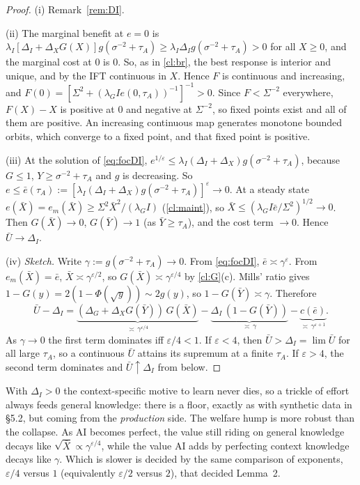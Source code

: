 \documentclass[11pt,a4paper]{article}
\theoremstyle{definition}
\theoremstyle{remark}
\newcommand{\tA}{\tau_A}
\newcommand{\lI}{\lambda_I}
\newcommand{\lG}{\lambda_G}
\begin{document}
\begin{proof}
(i) Remark~\ref{rem:DI}.

(ii) The marginal benefit at $e=0$ is $\lI[\Delta_I+\Delta_XG(X)]g(\sigma^{-2}+\tA)\ge\lI\Delta_Ig(\sigma^{-2}+\tA)>0$
for all $X\ge0$, and the marginal cost at $0$ is $0$. So, as in \cref{cl:br}, the best response is interior and
unique, and by the IFT continuous in $X$. Hence $F$ is continuous and increasing, and
$F(0)=[\Sigma^2+(\lG Ie(0,\tA))^{-1}]^{-1}>0$. Since $F<\Sigma^{-2}$ everywhere, $F(X)-X$ is positive at $0$ and
negative at $\Sigma^{-2}$, so fixed points exist and all of them are positive. An increasing continuous map
generates monotone bounded orbits, which converge to a fixed point, and that fixed point is positive.

(iii) At the solution of \eqref{eq:focDI},
$e^{1/\varepsilon}\le\lI(\Delta_I+\Delta_X)g(\sigma^{-2}+\tA)$, because $G\le1$, $Y\ge\sigma^{-2}+\tA$ and $g$ is decreasing. So
$e\le\bar e(\tA):=[\lI(\Delta_I+\Delta_X)g(\sigma^{-2}+\tA)]^\varepsilon\to0$. At a steady state
$e(\bar X)=e_m(\bar X)\ge\Sigma^2\bar X^2/(\lG I)$ (\cref{cl:maint}), so $\bar X\le(\lG I\bar e/\Sigma^2)^{1/2}\to0$.
Then $G(\bar X)\to0$, $G(\bar Y)\to1$ (as $\bar Y\ge\tA$), and the cost term $\to0$. Hence
$\bar U\to\Delta_I$.

(iv) \emph{Sketch.} Write $\gamma:=g(\sigma^{-2}+\tA)\to0$. From \eqref{eq:focDI}, $\bar e\asymp\gamma^\varepsilon$.
From $e_m(\bar X)=\bar e$, $\bar X\asymp\gamma^{\varepsilon/2}$, so $G(\bar X)\asymp\gamma^{\varepsilon/4}$ by
\cref{cl:G}(c). Mills' ratio gives $1-G(y)=2(1-\Phi(\sqrt y))\sim2g(y)$, so $1-G(\bar Y)\asymp\gamma$. Therefore
\[
\bar U-\Delta_I=\underbrace{(\Delta_G+\Delta_XG(\bar Y))\,G(\bar X)}_{\asymp\,\gamma^{\varepsilon/4}}
-\underbrace{\Delta_I\,(1-G(\bar Y))}_{\asymp\,\gamma}-\underbrace{c(\bar e)}_{\asymp\,\gamma^{\varepsilon+1}} .
\]
As $\gamma\to0$ the first term dominates iff $\varepsilon/4<1$. If $\varepsilon<4$, then $\bar U>\Delta_I=\lim\bar U$
for all large $\tA$, so a continuous $\bar U$ attains its supremum at a finite $\tA$. If $\varepsilon>4$, the
second term dominates and $\bar U\uparrow\Delta_I$ from below.
\end{proof}

\begin{intuition}
With $\Delta_I>0$ the context-specific motive to learn never dies, so a trickle of effort always feeds general
knowledge: there is a floor, exactly as with synthetic data in \S5.2, but coming from the \emph{production}
side. The welfare hump is more robust than the collapse. As AI becomes perfect, the value still riding on
general knowledge decays like $\sqrt{\bar X}\propto\gamma^{\varepsilon/4}$, while the value AI adds by
perfecting context knowledge decays like $\gamma$. Which is slower is decided by the same comparison of
exponents, $\varepsilon/4$ versus $1$ (equivalently $\varepsilon/2$ versus $2$), that decided Lemma~2.
\end{intuition}
\end{document}
